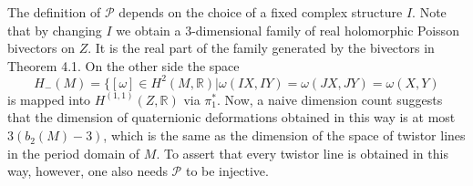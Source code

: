 \documentclass[11pt,oneside,leqno]{amsart}
\theoremstyle{plain}
\theoremstyle{definition}
\begin{document}
The definition of $\mathcal{P}$ depends on the choice of a fixed complex structure $I$.
Note that by changing $I$ we obtain a 3-dimensional family of real holomorphic Poisson bivectors on $Z$. It is the
real part of the family generated by the bivectors in Theorem 4.1. On the other side the space $$H_-(M) = \{[\omega]\in H^2(M, \mathbb{R})|\omega(IX,IY)=\omega(JX,JY)=\omega(X,Y)$$ is mapped into $H^{(1,1)}(Z,\mathbb{R})$ via $\pi_1^*$. Now, a naive dimension count suggests that the dimension of quaternionic deformations obtained in this way is at most $3(b_2(M) -3)$, which is the same as the dimension of the space of twistor lines in the period domain of $M$. To assert that every twistor line is obtained in this way, however, one also needs $\mathcal{P}$ to be injective.

\vspace{.1in}
\end{document}
